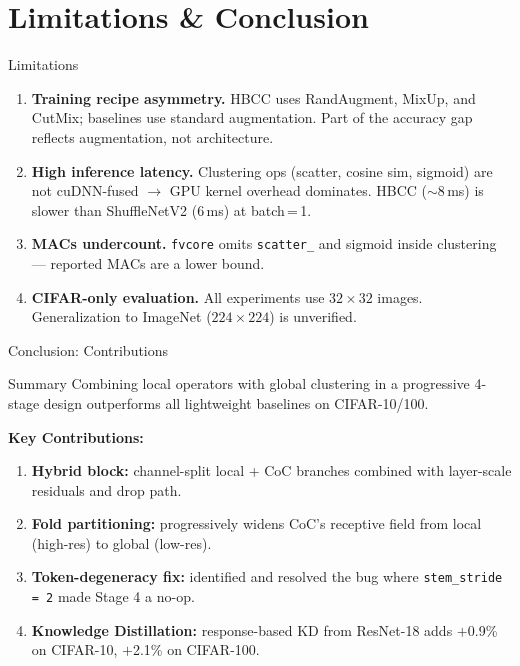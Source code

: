 \documentclass{beamer}
\begin{document}
\section{Limitations \& Conclusion}

\begin{frame}{Limitations}
  \begin{enumerate}\setlength\itemsep{9pt}
    \item \textbf{Training recipe asymmetry.}
          HBCC uses RandAugment, MixUp, and CutMix;
          baselines use standard augmentation.
          Part of the accuracy gap reflects augmentation, not architecture.

    \item \textbf{High inference latency.}
          Clustering ops (scatter, cosine sim, sigmoid) are not cuDNN-fused
          $\to$ GPU kernel overhead dominates.
          HBCC ($\sim$8\,ms) is slower than ShuffleNetV2 (6\,ms) at batch\,=\,1.

    \item \textbf{MACs undercount.}
          \texttt{fvcore} omits \texttt{scatter\_} and sigmoid inside
          clustering --- reported MACs are a lower bound.

    \item \textbf{CIFAR-only evaluation.}
          All experiments use $32\!\times\!32$ images.
          Generalization to ImageNet ($224\!\times\!224$) is unverified.
  \end{enumerate}
\end{frame}

\begin{frame}{Conclusion: Contributions}
  \begin{block}{Summary}
    Combining local operators with global clustering in a progressive
    4-stage design outperforms all lightweight baselines on CIFAR-10/100.
  \end{block}

  \vspace{0.5em}
  \textbf{Key Contributions:}
  \begin{enumerate}\setlength\itemsep{9pt}
    \item \textbf{Hybrid block:} channel-split local + CoC branches
          combined with layer-scale residuals and drop path.
    \item \textbf{Fold partitioning:} progressively widens CoC's
          receptive field from local (high-res) to global (low-res).
    \item \textbf{Token-degeneracy fix:} identified and resolved
          the bug where \texttt{stem\_stride = 2} made Stage 4 a no-op.
    \item \textbf{Knowledge Distillation:} response-based KD from
          ResNet-18 adds $+$0.9\% on CIFAR-10, $+$2.1\% on CIFAR-100.
  \end{enumerate}
\end{frame}
\end{document}
